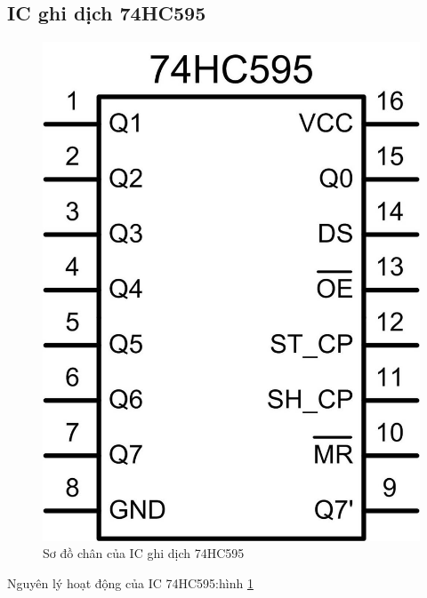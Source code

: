 \tocless \subsection{IC ghi dịch 74HC595}
\begin{figure}[!h]
\begin{center}
\includegraphics[scale=1.5]{phu-luc/image/74HC595}
\end{center}
\caption{Sơ đồ chân của IC ghi dịch 74HC595}\label{Fig:ngly-74hc595}
\end{figure}
Nguyên lý hoạt động của IC 74HC595:hình \ref{Fig:ngly-74hc595}
